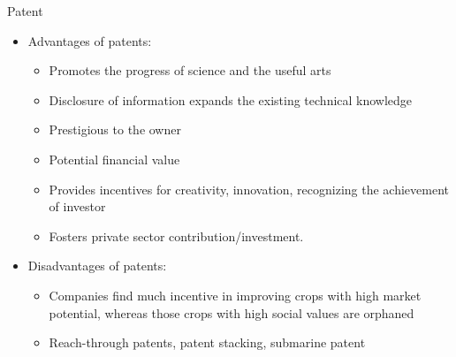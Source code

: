 \documentclass[ignorenonframetext,aspectratio=169]{beamer}
\providecommand{\tightlist}{%
  \setlength{\itemsep}{0pt}\setlength{\parskip}{0pt}}
\begin{document}
\begin{frame}{Patent}
\protect\hypertarget{patent-1}{}

\begin{itemize}
\tightlist
\item
  Advantages of patents:

  \begin{itemize}
  \tightlist
  \item
    Promotes the progress of science and the useful arts
  \item
    Disclosure of information expands the existing technical knowledge
  \item
    Prestigious to the owner
  \item
    Potential financial value
  \item
    Provides incentives for creativity, innovation, recognizing the
    achievement of investor
  \item
    Fosters private sector contribution/investment.
  \end{itemize}
\item
  Disadvantages of patents:

  \begin{itemize}
  \tightlist
  \item
    Companies find much incentive in improving crops with high market
    potential, whereas those crops with high social values are orphaned
  \item
    Reach-through patents, patent stacking, submarine patent
  \end{itemize}
\end{itemize}

\end{frame}
\end{document}
